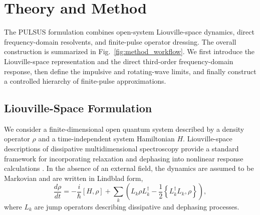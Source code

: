 \section{Theory and Method}
\label{sec:theory}
The PULSUS formulation combines open-system Liouville-space dynamics,
direct frequency-domain resolvents, and finite-pulse operator dressing.
The overall construction is summarized in Fig.~\ref{fig:method_workflow}.
We first introduce the Liouville-space representation and the direct
third-order frequency-domain response, then define the impulsive and
rotating-wave limits, and finally construct a controlled hierarchy of
finite-pulse approximations.
\subsection{Liouville-Space Formulation}
\label{sec:liouville}

We consider a finite-dimensional open quantum system described by a
density operator $\rho$ and a time-independent system Hamiltonian $H$.
Liouville-space descriptions of dissipative multidimensional
spectroscopy provide a standard framework for incorporating relaxation
and dephasing into nonlinear response calculations
\cite{
Abramavicius2009CoherentMultidimensional,
SandaMukamel2008StochasticLiouville}.
In the absence of an external field, the dynamics are assumed to be
Markovian and are written in Lindblad form,
%
\begin{equation}
\frac{d\rho}{dt}
=
-\frac{i}{\hbar}[H,\rho]
+
\sum_k
\left(
L_k \rho L_k^\dagger
-\frac{1}{2}
\left\{
L_k^\dagger L_k,\rho
\right\}
\right),
\label{eq:lindblad}
\end{equation}
%
where $L_k$ are jump operators describing dissipative and dephasing
processes.

